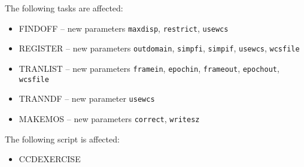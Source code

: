 \documentclass[twoside,11pt]{article}
\newcommand{\htmlref}[2]{#1}
\newcommand{\latexhtml}[2]{#1}
\renewcommand{\_}{\texttt{\symbol{95}}}
\newcommand{\ttsize}{\latexhtml{\small}{}}
\newcommand{\text}[1]{{\ttsize \tt #1}}
\newcommand{\xroutine}[1]{\htmlref{{\sc #1}}{#1}}
\begin{document}
\begin{itemize}
\begin{itemize}
    The following tasks are affected:
       \begin{itemize}
       \item \xroutine{FINDOFF} --   new parameters 
          \text{maxdisp}, \text{restrict}, \text{usewcs}
       \item \xroutine{REGISTER} --  new parameters 
          \text{outdomain}, \text{simpfi}, \text{simpif}, \text{usewcs},
          \text{wcsfile}
       \item \xroutine{TRANLIST} --  new parameters 
          \text{framein}, \text{epochin}, \text{frameout}, 
          \text{epochout}, \text{wcsfile}
       \item \xroutine{TRANNDF} --   new parameter  
          \text{usewcs}
       \item \xroutine{MAKEMOS} --   new parameters 
          \text{correct}, \text{writesz}
       \end{itemize}
    The following script is affected:
       \begin{itemize}
       \item \xroutine{CCDEXERCISE}
       \end{itemize}


\end{itemize}
\end{itemize}
\end{document}
